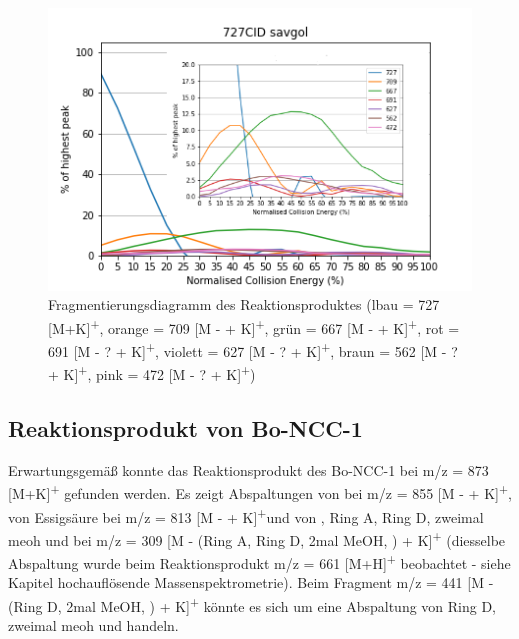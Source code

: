 \begin{figure}[!htbp]
  \centering
  \includegraphics[scale=0.7]{figures/Kapitel4/Kataboliten/diags/727CID-savgol.png}
  \caption[Fragmentierungsdiagramm des Reaktionsproduktes von Bo-DNCC, Quelle: Autor]{Fragmentierungsdiagramm des Reaktionsproduktes (lbau = 727 [M+K]\textsuperscript{+}, orange = 709 [M -  + K]\textsuperscript{+}, grün = 667 [M -  + K]\textsuperscript{+}, rot = 691 [M - ? + K]\textsuperscript{+}, violett = 627 [M - ? + K]\textsuperscript{+}, braun = 562 [M - ? + K]\textsuperscript{+}, pink = 472 [M - ? + K]\textsuperscript{+})}
  \label{fig:727MKLeafspraydiags}
\end{figure}



\subsection{Reaktionsprodukt von Bo-NCC-1}

Erwartungsgemäß konnte das Reaktionsprodukt des Bo-NCC-1 bei m/z = 873 [M+K]\textsuperscript{+} gefunden werden. Es zeigt Abspaltungen von  bei m/z = 855 [M -  + K]\textsuperscript{+}, von Essigsäure bei m/z = 813 [M -  + K]\textsuperscript{+}und von , Ring A, Ring D, zweimal \gls{meoh} und  bei m/z = 309 [M - (Ring A, Ring D, 2mal MeOH, )  + K]\textsuperscript{+} (diesselbe Abspaltung wurde beim Reaktionsprodukt m/z = 661 [M+H]\textsuperscript{+} beobachtet - siehe Kapitel hochauflösende Massenspektrometrie). Beim Fragment m/z = 441 [M - (Ring D, 2mal MeOH, ) + K]\textsuperscript{+} könnte es sich um eine Abspaltung von Ring D, zweimal \gls{meoh} und  handeln. 

